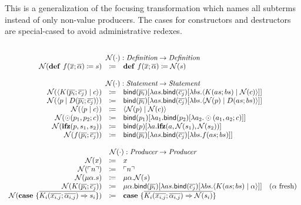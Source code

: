 This is a generalization of the focusing transformation which names all subterms instead of only non-value producers.
The cases for constructors and destructors are special-cased to avoid administrative redexes.

\[
  \begin{array}{rcll}
    \\
    \multicolumn{4}{c}{\name{\cdot} : \emph{Definition} \rightarrow \emph{Definition}}\\
    \name{\defi{f(\overline{x}; \overline{\alpha})}{s}} & \coloneq & \defi{f(\overline{x}; \overline{\alpha})}{\name{s}} & \\
    \\
    \multicolumn{4}{c}{\name{\cdot} : \emph{Statement} \rightarrow \emph{Statement}}\\
    \name{\cut{K(\overline{p_i}; \overline{c_j})}{c}} & \coloneq & \bind{\overline{p_i}}{\lambda as.\bind{\overline{c_j}}{\lambda bs.\cut{K(as; bs)}{\name{c}}}} & \\
    \name{\cut{p}{D(\overline{p_i}; \overline{c_j})}} & \coloneq & \bind{\overline{p_i}}{\lambda as.\bind{\overline{c_j}}{\lambda bs.\cut{\name{p}}{D(as; bs)}}} & \\
    \name{\cut{p}{c}} & \coloneq & \cut{\name{p}}{\name{c}} & \\
    \name{\odot(p_1, p_2; c)}{} & \coloneq & \bind{p_1}{\lambda a_1.\bind{p_2}{\lambda a_2.\odot(a_1, a_2; c)}} & \\
    \name{\ifz{p}{s_1}{s_2}}{} & \coloneq & \bind{p}{\lambda a.\ifz{a}{\name{s_1}}{\name{s_2}}} & \\
    \name{f(\overline{p_i}; \overline{c_j})}{} & \coloneq & \bind{\overline{p_i}}{\lambda as.\bind{\overline{c_j}}{\lambda bs.f(as; bs)}} & \\
    \\
    \multicolumn{4}{c}{\name{\cdot} : \emph{Producer} \rightarrow \emph{Producer}}\\
    \name{x} & \coloneq & x & \\
    \name{\lit{n}} & \coloneq & \lit{n} & \\
    \name{\mu\alpha.s} & \coloneq & \mu\alpha.\name{s} & \\
    \name{K(\overline{p_i}; \overline{c_j})} & \coloneq & \mu\alpha.\bind{\overline{p_i}}{\lambda as.\bind{\overline{c_j}}{\lambda bs.\cut{K(as; bs)}{\alpha}}} & \fresh{\alpha} \\
    \name{\case{\overline{K_i(\overline{x_{i,j}}; \overline{\alpha_{i,j}}) \Rightarrow s_i}}} & \coloneq & \case{\overline{K_i(\overline{x_{i,j}}; \overline{\alpha_{i,j}}) \Rightarrow \name{s_i}}} & \\

\end{array}\]
